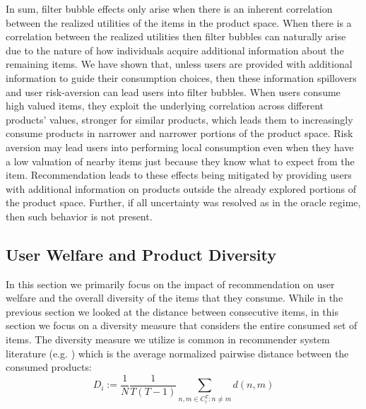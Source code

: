 \documentclass[format=acmsmall, review=false]{acmart}
\begin{document}
In sum, filter bubble effects only arise when there is an inherent correlation between the realized utilities of the items in the product space. When there is a correlation between the realized utilities then filter bubbles can naturally arise due to the nature of how individuals acquire additional information about the remaining items. We have shown that, unless users are provided with additional information to guide their consumption choices, then these information spillovers and user risk-aversion can lead users into filter bubbles. When users consume high valued items, they exploit the underlying correlation across different products' values, stronger for similar products, which leads them to increasingly consume products in narrower and narrower portions of the product space. Risk aversion may lead users into performing local consumption even when they have a low valuation of nearby items just because they know what to expect from the item. Recommendation leads to these effects being mitigated by providing users with additional information on products outside the already explored portions of the product space. Further, if all uncertainty was resolved as in the oracle regime, then such behavior is not present.

\subsection{User Welfare and Product Diversity}
In this section we primarily focus on the impact of recommendation on user welfare and the overall diversity of the items that they consume. While in the previous section we looked at the distance between consecutive items, in this section we focus on a diversity measure that considers the entire consumed set of items. The diversity measure we utilize is common in recommender system literature (e.g. \cite{ziegler2005improving}) which is the average normalized pairwise distance between the consumed products:
$$D_i:=\frac{1}{N}\frac{1}{T(T-1)}\sum_{n,m \in C_i^T: n \ne m} d(n,m)$$
\end{document}

